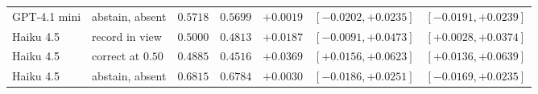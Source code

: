 \begin{table}[H]
\begin{tabular}{@{}llrrrll@{}}
GPT-4.1 mini & abstain, absent & $0.5718$ & $0.5699$ & $+0.0019$ & $[-0.0202,+0.0235]$ & $[-0.0191,+0.0239]$ \\
Haiku 4.5 & record in view & $0.5000$ & $0.4813$ & $+0.0187$ & $[-0.0091,+0.0473]$ & $[+0.0028,+0.0374]$ \\
Haiku 4.5 & correct at $0.50$ & $0.4885$ & $0.4516$ & $+0.0369$ & $[+0.0156,+0.0623]$ & $[+0.0136,+0.0639]$ \\
Haiku 4.5 & abstain, absent & $0.6815$ & $0.6784$ & $+0.0030$ & $[-0.0186,+0.0251]$ & $[-0.0169,+0.0235]$ \\
\bottomrule\end{tabular}
\end{table}
